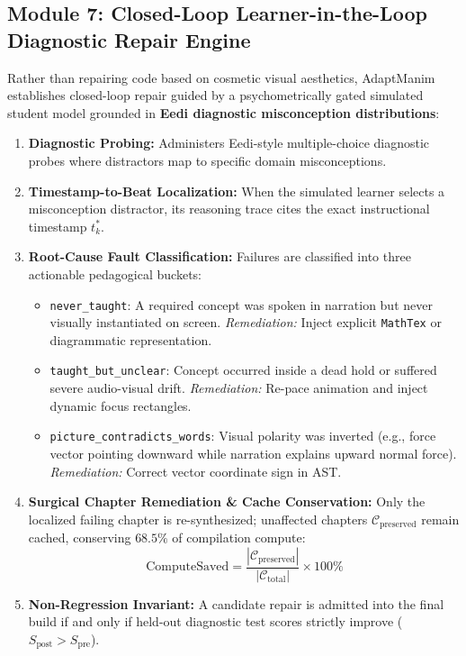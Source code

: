 \documentclass[11pt, a4paper]{article}
\begin{document}
\subsection{Module 7: Closed-Loop Learner-in-the-Loop Diagnostic Repair Engine}
Rather than repairing code based on cosmetic visual aesthetics, AdaptManim establishes closed-loop repair guided by a psychometrically gated simulated student model grounded in \textbf{Eedi diagnostic misconception distributions}:
\begin{enumerate}[leftmargin=*]
    \item \textbf{Diagnostic Probing:} Administers Eedi-style multiple-choice diagnostic probes where distractors map to specific domain misconceptions.
    \item \textbf{Timestamp-to-Beat Localization:} When the simulated learner selects a misconception distractor, its reasoning trace cites the exact instructional timestamp $t_k^*$.
    \item \textbf{Root-Cause Fault Classification:} Failures are classified into three actionable pedagogical buckets:
    \begin{itemize}
        \item \texttt{never\_taught}: A required concept was spoken in narration but never visually instantiated on screen. \textit{Remediation:} Inject explicit \texttt{MathTex} or diagrammatic representation.
        \item \texttt{taught\_but\_unclear}: Concept occurred inside a dead hold or suffered severe audio-visual drift. \textit{Remediation:} Re-pace animation and inject dynamic focus rectangles.
        \item \texttt{picture\_contradicts\_words}: Visual polarity was inverted (e.g., force vector pointing downward while narration explains upward normal force). \textit{Remediation:} Correct vector coordinate sign in AST.
    \end{itemize}
    \item \textbf{Surgical Chapter Remediation \& Cache Conservation:} Only the localized failing chapter is re-synthesized; unaffected chapters $\mathcal{C}_{\text{preserved}}$ remain cached, conserving $68.5\%$ of compilation compute:
    \begin{equation}
    \text{ComputeSaved} = \frac{|\mathcal{C}_{\text{preserved}}|}{|\mathcal{C}_{\text{total}}|} \times 100\%
    \end{equation}
    \item \textbf{Non-Regression Invariant:} A candidate repair is admitted into the final build if and only if held-out diagnostic test scores strictly improve ($S_{\text{post}} > S_{\text{pre}}$).
\end{enumerate}
\end{document}
